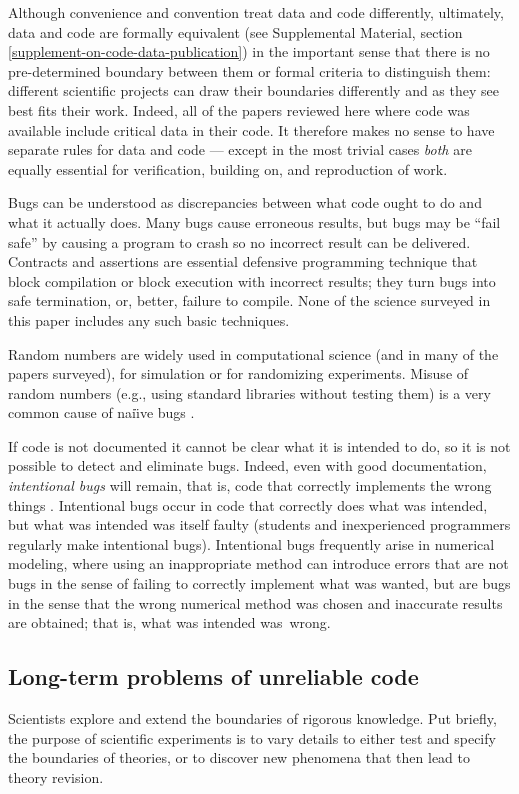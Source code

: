 \documentclass{comjnl}
\def\supplement{Supplemental Material}
\begin{document}
Although convenience and convention treat data and code differently, ultimately, data and code are formally equivalent (see \supplement, section \ref{supplement-on-code-data-publication}) in the important sense that there is no pre-determined boundary between them or formal criteria to distinguish them: different scientific projects can draw their boundaries differently and as they see best fits their work. Indeed, all of the papers reviewed here where code was available include critical data in their code. It therefore makes no sense to have separate rules for data and code --- except in the most trivial cases \emph{both\/} are equally essential for verification, building on, and reproduction of work. 

Bugs can be understood as discrepancies between what code ought to do and what it actually does. Many bugs cause erroneous results, but bugs may be ``fail safe'' by causing a program to crash so no incorrect result can be delivered. Contracts and assertions are essential defensive programming technique that block compilation or block execution with incorrect results; they turn bugs into safe termination, or, better, failure to compile. None of the science surveyed in this paper includes any such basic techniques. 

Random numbers are widely used in computational science (and in many of the papers surveyed), for simulation or for randomizing experiments. Misuse of random numbers (e.g., using standard libraries without testing them) is a very common cause of nai\"\i ve bugs \cite{knuth}.

If code is not documented it cannot be clear what it is intended to do, so it is not possible to detect and eliminate bugs. Indeed, even with good documentation, \emph{intentional bugs\/} will remain, that is, code that correctly implements the wrong things \cite{essence-of-software,fixit}. Intentional bugs occur in code that correctly does what was intended, but what was intended was itself faulty (students and inexperienced programmers regularly make intentional bugs). Intentional bugs frequently arise in numerical modeling, where using an inappropriate method can introduce errors that are not bugs in the sense of failing to correctly implement what was wanted, but are bugs in the sense that the wrong numerical method was chosen and inaccurate results are obtained; that is, what was intended was~wrong. 

\subsection{Long-term problems of unreliable code}
Scientists explore and extend the boundaries of rigorous knowledge. Put briefly, the purpose of scientific experiments is to vary details to either test and specify the boundaries of theories, or to discover new phenomena that then lead to theory revision. 
\end{document}
